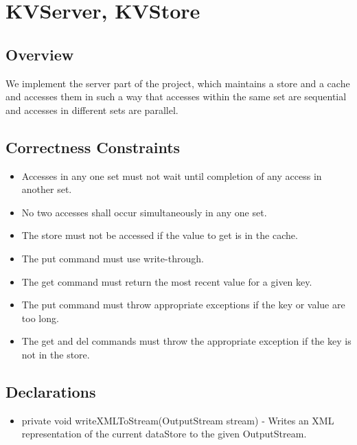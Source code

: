 \section{KVServer, KVStore}
\subsection{Overview}
We implement the server part of the project, which maintains a store and a cache and accesses them in such a way that accesses within the same set are sequential and accesses in different sets are parallel.
\subsection{Correctness Constraints}
\begin{itemize}
\item Accesses in any one set must not wait until completion of any access in another set.
\item No two accesses shall occur simultaneously in any one set.
\item The store must not be accessed if the value to get is in the cache.
\item The {\ttfamily put} command must use write-through.
\item The {\ttfamily get} command must return the most recent value for a given key.
\item The {\ttfamily put} command must throw appropriate exceptions if the key or value are too long.
\item The {\ttfamily get} and {\ttfamily del} commands must throw the appropriate exception if the key is not in the store.
\end{itemize}
\subsection{Declarations}
\begin{itemize}
\item {\ttfamily private void writeXMLToStream(OutputStream stream)} - Writes an XML representation of the current dataStore to the given OutputStream.
\end{itemize}
